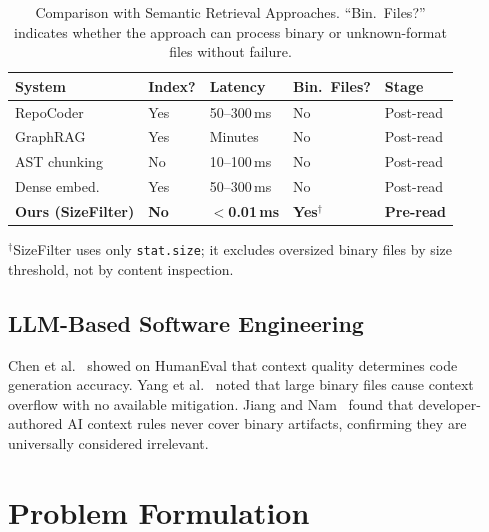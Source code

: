 \documentclass[conference]{IEEEtran}
\begin{document}
\begin{table}[t]
  \centering
  \caption{Comparison with Semantic Retrieval Approaches.
  ``Bin.~Files?'' indicates whether the approach can process
  binary or unknown-format files without failure.}
  \label{tab:baseline}
  \renewcommand{\arraystretch}{1.15}
  \begin{tabular}{@{}lllll@{}}
    \toprule
    \textbf{System} & \textbf{Index?} & \textbf{Latency} &
    \textbf{Bin.\ Files?} & \textbf{Stage} \\
    \midrule
    RepoCoder~\cite{repocoder}      & Yes & 50--300\,ms & No  & Post-read \\
    GraphRAG~\cite{graphrag}        & Yes & Minutes     & No  & Post-read \\
    AST chunking~\cite{treesitter}  & No  & 10--100\,ms & No  & Post-read \\
    Dense embed.~\cite{codebert}    & Yes & 50--300\,ms & No  & Post-read \\
    \textbf{Ours (SizeFilter)}      & \textbf{No} & \textbf{$<$0.01\,ms} &
      \textbf{Yes}$^\dagger$ & \textbf{Pre-read} \\
    \bottomrule
  \end{tabular}
  \vspace{1mm}
  {\small $^\dagger$SizeFilter uses only \texttt{stat.size}; it excludes
   oversized binary files by size threshold, not by content inspection.}
\end{table}

\subsection{LLM-Based Software Engineering}
Chen et al.~\cite{codex} showed on HumanEval that context quality
determines code generation accuracy. Yang et al.~\cite{sweagent} noted
that large binary files cause context overflow with no available
mitigation. Jiang and Nam~\cite{cursorrules} found that
developer-authored AI context rules never cover binary artifacts,
confirming they are universally considered irrelevant.

\section{Problem Formulation}
\end{document}
